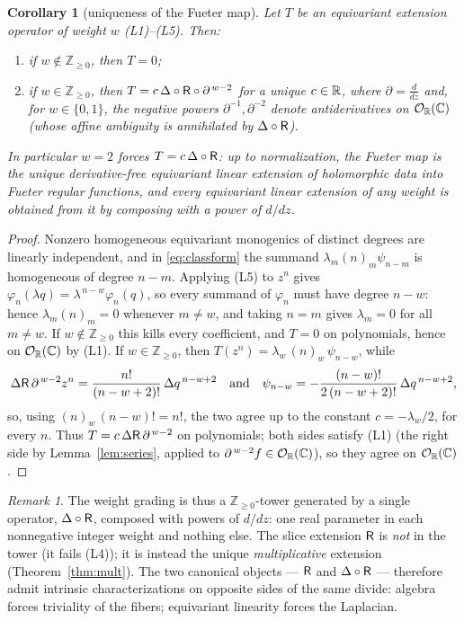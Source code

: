 \documentclass[11pt]{amsart}
\newtheorem{corollary}[theorem]{Corollary}
\theoremstyle{definition}
\theoremstyle{remark}
\newtheorem{remark}[theorem]{Remark}
\begin{document}
\begin{corollary}[uniqueness of the Fueter map]\label{cor:fueterunique}
Let $T$ be an equivariant extension operator of weight $w$
\textup{(L1)--(L5)}.  Then:
\begin{enumerate}
\item if $w\notin\mathbb{Z}_{\ge0}$, then $T=0$;
\item if $w\in\mathbb{Z}_{\ge0}$, then
$T=c\,\Delta\circ\mathsf{R}\circ\partial^{\,w-2}$ for a unique $c\in\mathbb{R}$,
where $\partial=\tfrac{d}{dz}$ and, for $w\in\{0,1\}$, the negative
powers $\partial^{-1},\partial^{-2}$ denote antiderivatives on $\mathcal{O}_{\mathbb{R}}(\mathbb{C})$
\textup{(}whose affine ambiguity is annihilated by
$\Delta\circ\mathsf{R}$\textup{)}.
\end{enumerate}
In particular $w=2$ forces $T=c\,\Delta\circ\mathsf{R}$: \emph{up to
normalization, the Fueter map is the unique derivative-free equivariant
linear extension of holomorphic data into Fueter regular functions, and
every equivariant linear extension of any weight is obtained from it by
composing with a power of $d/dz$.}
\end{corollary}

\begin{proof}
Nonzero homogeneous equivariant monogenics of distinct degrees are
linearly independent, and in \eqref{eq:classform} the summand
$\lambda_m(n)_m\psi_{n-m}$ is homogeneous of degree $n-m$.  Applying
(L5) to $z^n$ gives $\varphi_n(\lambda q)=\lambda^{\,n-w}\varphi_n(q)$,
so every summand of $\varphi_n$ must have degree $n-w$: hence
$\lambda_m(n)_m=0$ whenever $m\neq w$, and taking $n=m$ gives
$\lambda_m=0$ for all $m\neq w$.  If $w\notin\mathbb{Z}_{\ge0}$ this
kills every coefficient, and $T=0$ on polynomials, hence on $\mathcal{O}_{\mathbb{R}}(\mathbb{C})$ by
(L1).  If $w\in\mathbb{Z}_{\ge0}$, then
$T(z^n)=\lambda_w\,(n)_w\,\psi_{n-w}$, while
\[
\Delta\mathsf{R}\,\partial^{\,w-2}z^n
=\frac{n!}{(n-w+2)!}\,\Delta q^{\,n-w+2}
\quad\text{and}\quad
\psi_{n-w}=-\frac{(n-w)!}{2\,(n-w+2)!}\,\Delta q^{\,n-w+2},
\]
so, using $(n)_w\,(n-w)!=n!$, the two agree up to the constant
$c=-\lambda_w/2$, for every $n$.  Thus $T=c\,\Delta\mathsf{R}\,
\partial^{\,w-2}$ on polynomials; both sides satisfy (L1) (the right
side by Lemma~\ref{lem:series}, applied to $\partial^{\,w-2}f\in\mathcal{O}_{\mathbb{R}}(\mathbb{C})$),
so they agree on $\mathcal{O}_{\mathbb{R}}(\mathbb{C})$.
\end{proof}

\begin{remark}\label{rem:integralweights}
The weight grading is thus a $\mathbb{Z}_{\ge0}$-tower generated by a
single operator, $\Delta\circ\mathsf{R}$, composed with powers of $d/dz$:
one real parameter in each nonnegative integer weight and nothing else.
The slice extension $\mathsf{R}$ is \emph{not} in the tower (it fails (L4));
it is instead the unique \emph{multiplicative} extension
(Theorem~\ref{thm:mult}).  The two canonical objects --- $\mathsf{R}$ and
$\Delta\circ\mathsf{R}$ --- therefore admit intrinsic characterizations on
opposite sides of the same divide: algebra forces triviality of the
fibers; equivariant linearity forces the Laplacian.
\end{remark}
\end{document}
